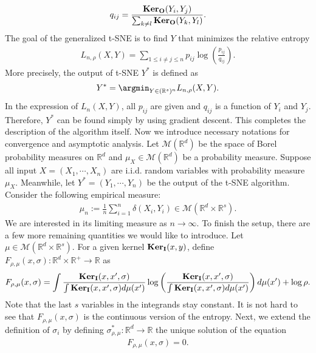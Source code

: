 \begin{align}
    q_{ij} = \frac{\mathbf{Ker}_{\mathbf{O}}(Y_i,Y_j)}{\sum_{k \neq l}\mathbf{Ker}_{\mathbf{O}}(Y_k,Y_l)}.
\end{align}
The goal of the generalized t-SNE is to find $Y$ that minimizes the relative entropy
\begin{align}
    L_{n,\rho}(X,Y) = \sum_{1 \leq i \neq j \leq n} p_{ij} \log \left(\frac{p_{ij}}{q_{ij}}\right).
\end{align}
More precisely, the output of t-SNE $Y^*$ is defined as
\begin{align}
    Y^* = \argmin_{Y \in (\mathbb{R}^s)^n}L_{n,\rho}(X,Y).
\end{align}
In the expression of $L_n(X,Y)$, all $p_{ij}$ are given and $q_{ij}$ is a function of $Y_i$ and $Y_j$. Therefore, $Y^*$ can be found simply by using gradient descent. This completes the description of the algorithm itself. Now we introduce necessary notations for convergence and asymptotic analysis. Let $\mathcal{M}(\mathbb{R}^d)$ be the space of Borel probability measures on $\mathbb{R}^d$ and $\mu_X \in \mathcal{M}(\mathbb{R}^d)$ be a probability measure. Suppose all input $X = (X_1,\cdots,X_n)$ are i.i.d. random variables with probability measure $\mu_X$. Meanwhile, let $Y^* = (Y_1,\cdots,Y_n)$ be the output of the t-SNE algorithm. Consider the following empirical measure:
\begin{align}
    \mu_n := \frac{1}{n} \sum_{i=1}^n \delta(X_i,Y_i) \in \mathcal{M}(\mathbb{R}^d \times \mathbb{R}^s).
\end{align}
We are interested in its limiting measure as $n \to \infty$. To finish the setup, there are a few more remaining quantities we would like to introduce. Let $\mu \in \mathcal{M}(\mathbb{R}^d \times \mathbb{R}^s)$. For a given kernel $\mathbf{Ker}_{\mathbf{I}}(x,y)$, define $F_{\rho,\mu}(x,\sigma) : \mathbb{R}^d \times \mathbb{R}^+ \to \mathbb{R}$ as
\begin{align}
    F_{\rho,\mu}(x,\sigma) = \int \frac{\mathbf{Ker}_{\mathbf{I}}(x,x',\sigma)}{\int \mathbf{Ker}_{\mathbf{I}}(x,x',\sigma)d\mu(x')} \log \left(\frac{\mathbf{Ker}_{\mathbf{I}}(x,x',\sigma)}{\int \mathbf{Ker}_{\mathbf{I}}(x,x',\sigma)d\mu(x')}\right) d\mu(x') + \log \rho.
\end{align}
Note that the last $s$ variables in the integrands stay constant. It is not hard to see that $F_{\rho,\mu}(x,\sigma)$ is the continuous version of the entropy. Next, we extend the definition of $\sigma_i$ by defining $\sigma^*_{\rho,\mu} : \mathbb{R}^d \to \mathbb{R}$ the unique solution of the equation
\begin{align}
    F_{\rho,\mu}(x,\sigma) = 0.
\end{align}
